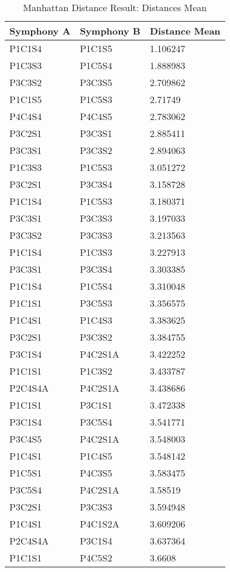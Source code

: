 \begin{longtable}{|l|l|l|}
\caption{Manhattan Distance Result: Distances Mean}
\label{my-label}\\
\hline
Symphony A & Symphony B & Distance Mean \\ \hline
\endfirsthead
%
\endhead
%
P1C1S4 & P1C1S5 & 1.106247 \\ \hline
P1C3S3 & P1C5S4 & 1.888983 \\ \hline
P3C3S2 & P3C3S5 & 2.709862 \\ \hline
P1C1S5 & P1C5S3 & 2.71749 \\ \hline
P4C4S4 & P4C4S5 & 2.783062 \\ \hline
P3C2S1 & P3C3S1 & 2.885411 \\ \hline
P3C3S1 & P3C3S2 & 2.894063 \\ \hline
P1C3S3 & P1C5S3 & 3.051272 \\ \hline
P3C2S1 & P3C3S4 & 3.158728 \\ \hline
P1C1S4 & P1C5S3 & 3.180371 \\ \hline
P3C3S1 & P3C3S3 & 3.197033 \\ \hline
P3C3S2 & P3C3S3 & 3.213563 \\ \hline
P1C1S4 & P1C3S3 & 3.227913 \\ \hline
P3C3S1 & P3C3S4 & 3.303385 \\ \hline
P1C1S4 & P1C5S4 & 3.310048 \\ \hline
P1C1S1 & P3C5S3 & 3.356575 \\ \hline
P1C4S1 & P1C4S3 & 3.383625 \\ \hline
P3C2S1 & P3C3S2 & 3.384755 \\ \hline
P3C1S4 & P4C2S1A & 3.422252 \\ \hline
P1C1S1 & P1C3S2 & 3.433787 \\ \hline
P2C4S4A & P4C2S1A & 3.438686 \\ \hline
P1C1S1 & P3C1S1 & 3.472338 \\ \hline
P3C1S4 & P3C5S4 & 3.541771 \\ \hline
P3C4S5 & P4C2S1A & 3.548003 \\ \hline
P1C4S1 & P1C4S5 & 3.548142 \\ \hline
P1C5S1 & P4C3S5 & 3.583475 \\ \hline
P3C5S4 & P4C2S1A & 3.58519 \\ \hline
P3C2S1 & P3C3S3 & 3.594948 \\ \hline
P1C4S1 & P4C1S2A & 3.609206 \\ \hline
P2C4S4A & P3C1S4 & 3.637364 \\ \hline
P1C1S1 & P4C5S2 & 3.6608 \\ \hline
\end{longtable}

